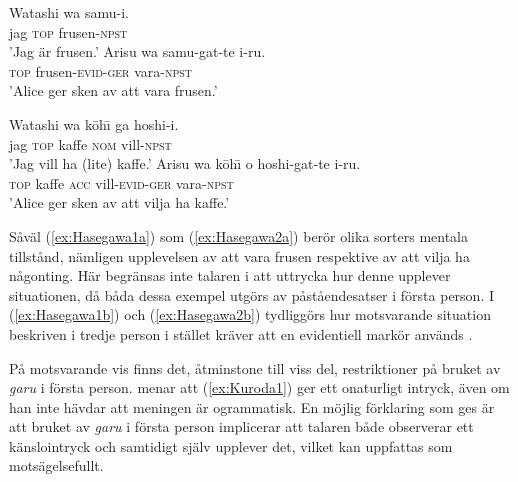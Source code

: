 \documentclass[12pt,a4paper]{article}
\begin{document}
\begin{exe}
\ex
\begin{xlist}
\ex
\label{ex:Hasegawa1a}
\gll Watashi wa samu-i. \\
     jag \textsc{top} frusen-\textsc{npst} \\
\glt 'Jag är frusen.'
\ex
\label{ex:Hasegawa1b}
\gll Arisu wa samu-gat-te i-ru. \\
     {} \textsc{top} frusen-\textsc{evid}-\textsc{ger} vara-\textsc{npst} \\
\glt 'Alice ger sken av att vara frusen.'
\hfill \autocite[313]{hasegawa2015}
\end{xlist}
\end{exe}

\begin{exe}
\ex
\begin{xlist}
\ex
\label{ex:Hasegawa2a}
\gll Watashi wa k\=oh\={\i} ga hoshi-i. \\
     jag \textsc{top} kaffe \textsc{nom} vill-\textsc{npst} \\
\glt 'Jag vill ha (lite) kaffe.'
\ex
\label{ex:Hasegawa2b}
\gll Arisu wa k\=oh\={\i} o hoshi-gat-te i-ru. \\
     {} \textsc{top} kaffe \textsc{acc} vill-\textsc{evid}-\textsc{ger} vara-\textsc{npst} \\
\glt 'Alice ger sken av att vilja ha kaffe.'
\hfill \autocite[313--314]{hasegawa2015}
\end{xlist}
\end{exe}

\noindent
Såväl (\ref{ex:Hasegawa1a}) som (\ref{ex:Hasegawa2a}) berör olika sorters mentala tillstånd, nämligen upplevelsen av att vara frusen respektive av att vilja ha någonting. Här begränsas inte talaren i att uttrycka hur denne upplever situationen, då båda dessa exempel utgörs av påståendesatser i första person. I (\ref{ex:Hasegawa1b}) och (\ref{ex:Hasegawa2b}) tydliggörs hur motsvarande situation beskriven i tredje person i stället kräver att en evidentiell markör används \autocite{hasegawa2015,hasegawa2005}.

På motsvarande vis finns det, åtminstone till viss del, restriktioner på bruket av \emph{garu} i första person. \textcite{kuroda1973} menar att (\ref{ex:Kuroda1}) ger ett onaturligt intryck, även om han inte hävdar att meningen är ogrammatisk. En möjlig förklaring som ges är att bruket av \emph{garu} i första person implicerar att talaren både observerar ett känslointryck och samtidigt själv upplever det, vilket kan uppfattas som motsägelsefullt.
\end{document}
